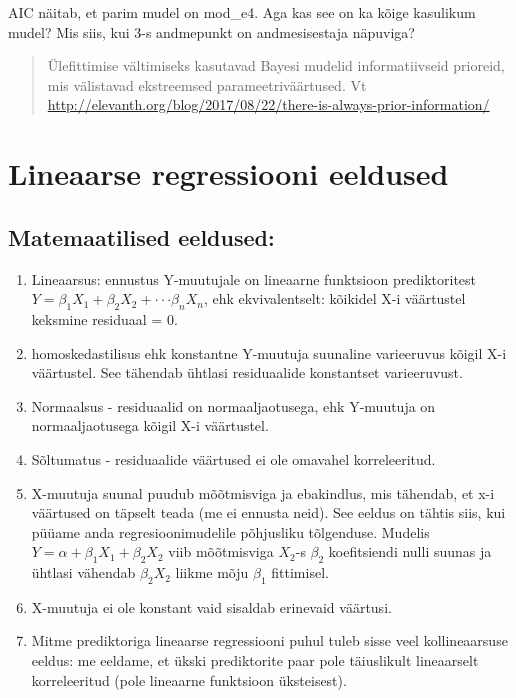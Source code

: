 \documentclass[]{book}
\begin{document}
AIC näitab, et parim mudel on mod\_e4. Aga kas see on ka kõige kasulikum
mudel? Mis siis, kui 3-s andmepunkt on andmesisestaja näpuviga?

\begin{quote}
Ülefittimise vältimiseks kasutavad Bayesi mudelid informatiivseid
prioreid, mis välistavad ekstreemsed parameetriväärtused. Vt
\url{http://elevanth.org/blog/2017/08/22/there-is-always-prior-information/}
\end{quote}

\section{Lineaarse regressiooni
eeldused}\label{lineaarse-regressiooni-eeldused}

\subsection*{Matemaatilised eeldused:}\label{matemaatilised-eeldused}

\begin{enumerate}
\def\labelenumi{\arabic{enumi}.}
\item
  Lineaarsus: ennustus Y-muutujale on lineaarne funktsioon
  prediktoritest \(Y = \beta_1X_1 + \beta_2X_2 +···\beta_nX_n\), ehk
  ekvivalentselt: kõikidel X-i väärtustel keksmine residuaal = 0.
\item
  homoskedastilisus ehk konstantne Y-muutuja suunaline varieeruvus
  kõigil X-i väärtustel. See tähendab ühtlasi residuaalide konstantset
  varieeruvust.
\item
  Normaalsus - residuaalid on normaaljaotusega, ehk Y-muutuja on
  normaaljaotusega kõigil X-i väärtustel.
\item
  Sõltumatus - residuaalide väärtused ei ole omavahel korreleeritud.
\item
  X-muutuja suunal puudub mõõtmisviga ja ebakindlus, mis tähendab, et
  x-i väärtused on täpselt teada (me ei ennusta neid). See eeldus on
  tähtis siis, kui püüame anda regresioonimudelile põhjusliku
  tõlgenduse. Mudelis \(Y = \alpha + \beta_1X_1 + \beta_2X_2\) viib
  mõõtmisviga \(X_2\)-s \(\beta_2\) koefitsiendi nulli suunas ja ühtlasi
  vähendab \(\beta_2X_2\) liikme mõju \(\beta_1\) fittimisel.
\item
  X-muutuja ei ole konstant vaid sisaldab erinevaid väärtusi.
\item
  Mitme prediktoriga lineaarse regressiooni puhul tuleb sisse veel
  kollineaarsuse eeldus: me eeldame, et ükski prediktorite paar pole
  täiuslikult lineaarselt korreleeritud (pole lineaarne funktsioon
  üksteisest).
\end{enumerate}
\end{document}
